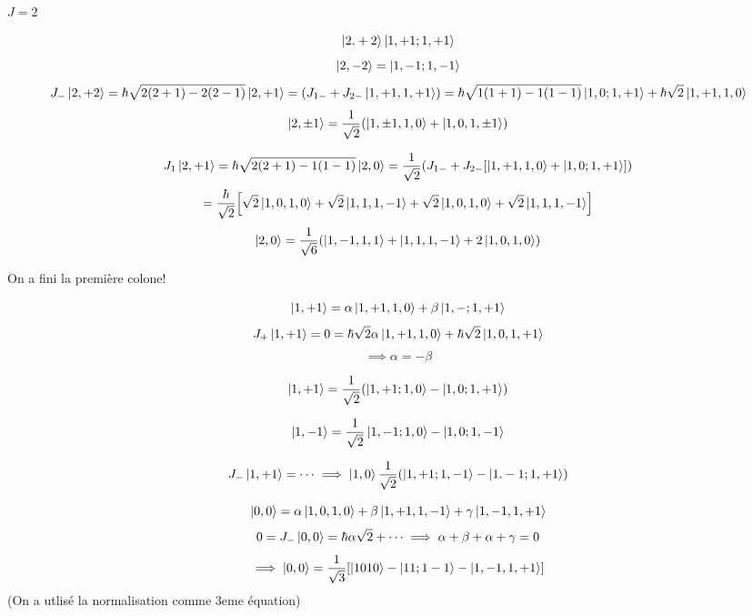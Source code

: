 $J = 2$

$$\ket{2.+2} \ket{1,+1;1,+1}$$ 
$$\ket{2, -2}=\ket{1,-1;1,-1}$$ 
$$J_-\ket{2, +2}=\hbar\sqrt{2(2+1) - 2(2-1)}\ket{2, +1} = (J_{1-} + J_{2-} \ket{1, +1,1,+1})= \hbar\sqrt{1(1+1) - 1(1-1)}\ket{1,0;1,+1} + \hbar\sqrt2\ket{1,+1,1,0}$$ 
$$\ket{2, \pm 1} = \frac{1}{\sqrt{2}} (\ket{1, \pm 1, 1, 0}+ \ket{1,0,1,\pm1})$$ 


$$J_1\ket{2,+1} = \hbar\sqrt{2(2+1)-1(1-1)}\ket{2,0} = \frac{1}{\sqrt2} (J_{1-}+ J_{2-}\qty[\ket{1,+1,1,0}+\ket{1,0;1,+1}])$$ 
$$= \frac{\hbar}{\sqrt2} \qty[\sqrt 2 \ket{1,0,1,0} + \sqrt2\ket{1,1,1,-1} + \sqrt2 \ket{1,0,1,0} + \sqrt2\ket{1,1,1,-1}]$$ 
$$\ket{2,0} = \frac{1}{\sqrt6} \qty(\ket{1,-1,1,1}+ \ket{1,1,1,-1}+ 2\ket{1,0,1,0})$$ 

On a fini la première colone!

$$\ket{1,+1} = \alpha\ket{1,+1, 1, 0} + \beta\ket{ 1,-;1,+1}$$ 
$$J_+\ket{1,+1} =0 = \hbar \sqrt 2 \alpha \ket{1,+1,1,0} + \hbar \sqrt2\ket{1,0,1,+1}$$ 
$$\implies \alpha = -\beta$$ 

$$\ket{1,+1} = \frac{1}{\sqrt{2}} \qty(\ket{1,+1;1,0}-\ket{1,0;1,+1})$$ 

$$\ket{1,-1} = \frac{1}{\sqrt{2}} \ket{1,-1;1,0}-\ket{1,0;1,-1}$$  

$$J_-\ket{1,+1} = \dotsb \implies \ket{1,0} \frac{1}{\sqrt{2}} \qty(\ket{1,+1;1,-1} -\ket{1.-1; 1, +1})$$ 

$$\ket{0,0}= \alpha\ket{1,0,1,0}+\beta\ket{1,+1,1,-1}+\gamma \ket{1,-1,1,+1}$$ 
$$0 = J_-\ket{0,0} = \hbar \alpha \sqrt{2} +\dotsb \implies \alpha+\beta +\alpha+\gamma=0$$ 
$$\implies \ket{0,0} = \frac{1}{\sqrt{3}} \qty[\ket{1010}-\ket{11;1-1} -\ket{1,-1,1,+1}]$$ 
(On a utlisé la normalisation comme 3eme équation)


